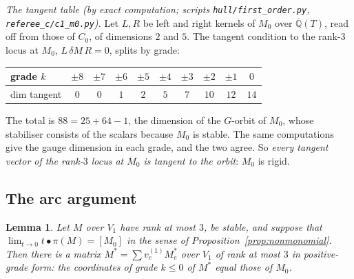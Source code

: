 \documentclass[11pt,a4paper]{article}
\theoremstyle{plain}
\newtheorem{lemma}{Lemma}[section]
\theoremstyle{definition}
\newcommand{\Qbar}{\overline{\mathbb{Q}}}
\newcommand{\scr}[1]{\nolinkurl{#1}}
\begin{document}
\emph{The tangent table (by exact computation; scripts \scr{hull/first_order.py}, \scr{referee_c/c1_m0.py}).} Let $L,R$ be left and right kernels of $M_{0}$ over $\Qbar(T)$, read off from those of $C_{0}$, of dimensions $2$ and $5$. The tangent condition to the rank-$3$ locus at $M_{0}$, $L\,\delta M\,R=0$, splits by grade:
\begin{center}
\begin{tabular}{l|ccccccccc}
grade $k$ & $\pm8$ & $\pm7$ & $\pm6$ & $\pm5$ & $\pm4$ & $\pm3$ & $\pm2$ & $\pm1$ & $0$\\\hline
dim tangent & $0$ & $0$ & $1$ & $2$ & $5$ & $7$ & $10$ & $12$ & $14$
\end{tabular}
\end{center}
The total is $88=25+64-1$, the dimension of the $G$-orbit of $M_{0}$, whose stabiliser consists of the scalars because $M_{0}$ is stable. The same computations give the gauge dimension in each grade, and the two agree. So \emph{every tangent vector of the rank-$3$ locus at $M_{0}$ is tangent to the orbit}: $M_{0}$ is rigid.

\subsection{The arc argument}

\begin{lemma}\label{lem:arc}
Let $M$ over $V_{1}$ have rank at most $3$, be stable, and suppose that $\lim_{t\to0}t\bullet\pi(M)=[M_{0}]$ in the sense of Proposition~\ref{prop:nonmonomial}. Then there is a matrix $M^{*}=\sum v_{e}^{(1)}M^{*}_{e}$ over $V_{1}$ of rank at most $3$ in \emph{positive-grade form}: the coordinates of grade $k\le0$ of $M^{*}$ equal those of $M_{0}$.
\end{lemma}
\end{document}
